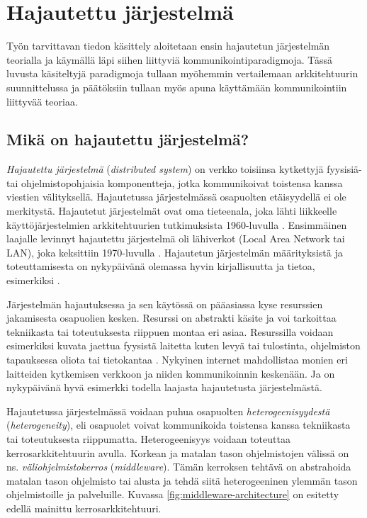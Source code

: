 \chapter{Hajautettu järjestelmä}
\label{ch:distributed-systems}
Työn tarvittavan tiedon käsittely aloitetaan ensin hajautetun järjestelmän teorialla ja käymällä läpi siihen liittyviä kommunikointiparadigmoja. Tässä luvusta käsiteltyjä paradigmoja tullaan myöhemmin vertailemaan arkkitehtuurin suunnittelussa ja päätöksiin tullaan myös apuna käyttämään kommunikointiin liittyvää teoriaa.


\section{Mikä on hajautettu järjestelmä?}
\emph{Hajautettu järjestelmä} (\emph{distributed system}) on verkko toisiinsa kytkettyjä fyysisiä- tai ohjelmistopohjaisia komponentteja, jotka kommunikoivat toistensa kanssa viestien välityksellä. Hajautetussa järjestelmässä osapuolten etäisyydellä ei ole merkitystä. Hajautetut järjestelmät ovat oma tieteenala, joka lähti liikkeelle käyttöjärjestelmien arkkitehtuurien tutkimuksista 1960-luvulla \cite[s.~384]{andrews2000foundations}. Ensimmäinen laajalle levinnyt hajautettu järjestelmä oli lähiverkot (Local Area Network tai LAN), joka keksittiin 1970-luvulla \cite[s.~32]{andrews2000foundations}. Hajautetun järjestelmän määrityksistä ja toteuttamisesta on nykypäivänä olemassa hyvin kirjallisuutta ja tietoa, esimerkiksi \cite{distributed-systems-concepts-and-design, distributed-event-based-systems, mullender1993distributed, baldoni2005distributed}.

Järjestelmän hajautuksessa ja sen käytössä on pääasiassa kyse resurssien jakamisesta osapuolien kesken. Resurssi on abstrakti käsite ja voi tarkoittaa tekniikasta tai toteutuksesta riippuen montaa eri asiaa. Resurssilla voidaan esimerkiksi kuvata jaettua fyysistä laitetta kuten levyä tai tulostinta, ohjelmiston tapauksessa oliota tai tietokantaa \cite[s.~2--3]{distributed-systems-concepts-and-design}. Nykyinen internet mahdollistaa monien eri laitteiden kytkemisen verkkoon ja niiden kommunikoinnin keskenään. Ja on nykypäivänä hyvä esimerkki todella laajasta hajautetusta järjestelmästä.

Hajautetussa järjestelmässä voidaan puhua osapuolten \emph{heterogeenisyydestä} (\emph{heterogeneity}), eli osapuolet voivat kommunikoida toistensa kanssa tekniikasta tai toteutuksesta riippumatta. Heterogeenisyys voidaan toteuttaa kerrosarkkitehtuurin avulla. Korkean ja matalan tason ohjelmistojen välissä on ns. \emph{väliohjelmistokerros} (\emph{middleware}). Tämän kerroksen tehtävä on abstrahoida matalan tason ohjelmisto tai alusta ja tehdä siitä heterogeeninen ylemmän tason ohjelmistoille ja palveluille. Kuvassa \ref{fig:middleware-architecture} on esitetty edellä mainittu kerrosarkkitehtuuri. \mbox{\cite[s. ~16--17]{distributed-systems-concepts-and-design}} \mbox{\cite[s.~2--3]{distributed-event-based-systems}}

